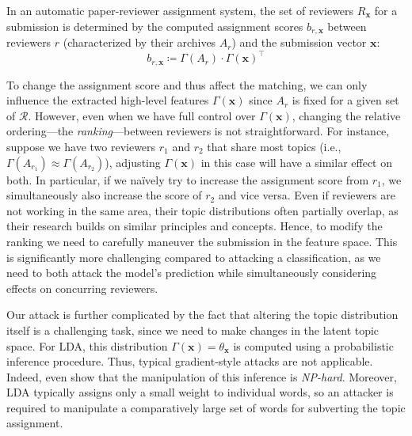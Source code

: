 \documentclass[letterpaper,twocolumn,10pt]{article}
\newcommand{\bow}{\textbf{x}}
\newcommand{\submission}{\bow}
\newcommand{\reviewersset}{\mathcal{R}}
\newcommand{\reviewersubset}{R}
\newcommand{\reviewer}{r}
\newcommand{\archive}{A}
\newcommand{\bid}{b}
\newcommand{\topicextractor}{\Gamma}
\newcommand{\topicdocumentdist}{\theta}
\begin{document}
In an automatic paper-reviewer assignment system, the set of reviewers $\reviewersubset_\submission$ for a submission is determined by the computed assignment scores $\bid_{\reviewer, \submission}$ between reviewers $\reviewer$ (characterized by their archives $\archive_\reviewer$) and the submission vector $\submission$: 
\begin{equation}
    \label{eq:score}
    \bid_{\reviewer, \submission}  \coloneqq \topicextractor(\archive_\reviewer) \cdot \topicextractor(\submission)^\top
\end{equation}

To change the assignment score and thus affect the matching, we can only influence the extracted high-level features $\topicextractor(\submission)$ since $\archive_r$ is fixed for a given set of $\reviewersset$. However, even when we have full control over $\topicextractor(\submission)$, changing the relative ordering---the \emph{ranking}---between reviewers is not straightforward. For instance, suppose we have two reviewers $\reviewer_1$ and $\reviewer_2$ that share most topics (i.e., $\topicextractor(\archive_{\reviewer_1}) \approx \topicextractor(\archive_{\reviewer_2})$), adjusting $\topicextractor(\submission)$ in this case will have a similar effect on both.
In particular, if we na\"ively  try to increase the assignment score from $\reviewer_1$, we simultaneously also increase the score of $\reviewer_2$ and vice versa. Even if reviewers are not working in the same area, their topic distributions often partially overlap, as their research builds on similar principles and concepts. Hence, to modify the ranking we need to carefully maneuver the submission in the feature space.
This is significantly more challenging compared to attacking a classification, as we need to both attack the model's prediction while simultaneously considering effects on concurring reviewers.

Our attack is further complicated by the fact that altering the topic distribution itself is a challenging task, since we need to make changes in the latent topic space. For \ac{LDA}, this distribution $\topicextractor(\submission) = \topicdocumentdist_\submission$ is computed using a probabilistic inference procedure. Thus, typical gradient-style attacks are not applicable. Indeed, \citet{zhou-20-evalda} even show that the manipulation of this inference is \emph{NP-hard}. Moreover, \ac{LDA} typically assigns only a small weight to individual words, so an attacker is required to manipulate a comparatively large set of words for {subverting\EndAccSupp{}} the topic assignment.
\end{document}
